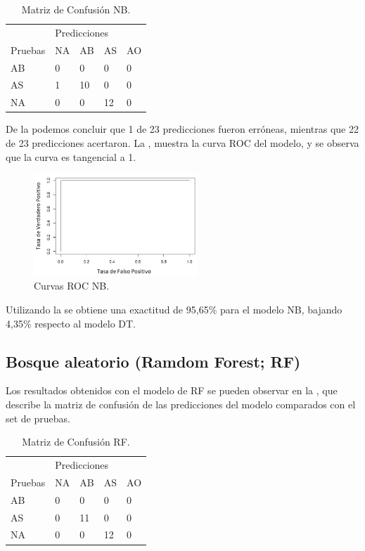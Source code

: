\documentclass{textolivre}
\begin{document}
\begin{table}[htpb]
\centering
\caption{Matriz de Confusión NB.}
\label{tab6}
\begin{tabular}{lllll}
\toprule 
  & \multicolumn{4}{l}{Predicciones}   \\ 
\cmidrule{2-5}
Pruebas        & NA      & AB       & AS       & AO
\\ 
\midrule
AB             & 0       & 0        & 0        & 0
\\ 
AS             & 1       & 10       & 0        & 0
\\
NA             & 0       & 0        & 12       & 0
\\
\bottomrule
\end{tabular}
\end{table}

De la  podemos concluir que 1 de 23 predicciones fueron erróneas, mientras que 22 de 23 predicciones acertaron. La , muestra la curva ROC del modelo, y se observa que la curva es tangencial a 1.

\begin{figure}[htbp]
 \centering
 \includegraphics[width=0.55\textwidth]{figura11.png}
 \caption{Curvas ROC NB.}
 \label{figura11}
\end{figure}

Utilizando la  se obtiene una exactitud de 95,65\% para el modelo NB, bajando 4,35\% respecto al modelo DT.

\subsection{Bosque aleatorio (Ramdom Forest; RF)}
Los resultados obtenidos con el modelo de RF  se pueden observar en la , que describe la matriz de confusión de las predicciones del modelo comparados con el set de pruebas.

\begin{table}[htpb]
\centering
\caption{Matriz de Confusión RF.}
\label{tab7}
\begin{tabular}{lllll}
\toprule 
 & \multicolumn{4}{l}{Predicciones}   \\ 
\cmidrule{2-5}
Pruebas        & NA      & AB       & AS       & AO
\\ 
\midrule
AB             & 0       & 0        & 0        & 0
\\ 
AS             & 0       & 11       & 0        & 0
\\
NA             & 0       & 0        & 12       & 0
\\
\bottomrule
\end{tabular}
\end{table}
\end{document}
